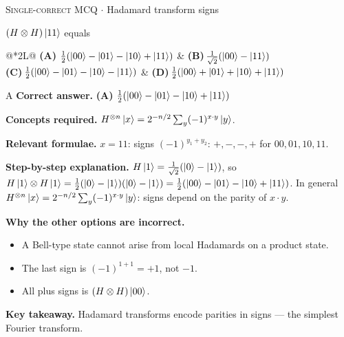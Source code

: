 \documentclass[11pt,a4paper]{article}
\newcommand{\optlabel}[1]{\textbf{(#1)}}
\newcommand{\correctlabel}[1]{\textcolor{okgreen}{\textbf{(#1)}\,\ding{51}}}
\newenvironment{qitem}[1]{\begin{list}{}{\setlength{\leftmargin}{3.3em}\setlength{\labelwidth}{3.1em}%
  \setlength{\labelsep}{0.2em}\setlength{\topsep}{3pt}\setlength{\parsep}{3pt}}\item[\textbf{Q.#1}\hfill]}{\end{list}}
\newcommand{\qsep}{\par\vspace{2pt}{\color{black!15}\hrule}\vspace{4pt}}
\newcommand{\qmeta}[2]{{\footnotesize\color{black!60}\textsc{#1} \;$\cdot$\; #2}\par}
\begin{document}
\begin{qitem}{28}
\qmeta{Single-correct MCQ}{Hadamard transform signs}
$(H\otimes H)\ket{11}$ equals
\par\smallskip\noindent\begin{tabularx}{\linewidth}{@{}*{2}{L}@{}}
\correctlabel{A}\,$\frac12(\ket{00} - \ket{01} - \ket{10} + \ket{11})$ & \optlabel{B}\,$\frac{1}{\sqrt2}(\ket{00} - \ket{11})$ \\[3pt]
\optlabel{C}\,$\frac12(\ket{00} - \ket{01} - \ket{10} - \ket{11})$ & \optlabel{D}\,$\frac12(\ket{00} + \ket{01} + \ket{10} + \ket{11})$
\end{tabularx}
\end{qitem}
\begin{solbox}{A}
\textbf{\color{brand}Correct answer.} \textcolor{okgreen}{\textbf{(A)}} $\frac12(\ket{00} - \ket{01} - \ket{10} + \ket{11})$

\textbf{\color{brand}Concepts required.} $H^{\otimes n}\ket x = 2^{-n/2}\sum_y(-1)^{x\cdot y}\ket y$.

\textbf{\color{brand}Relevant formulae.} $x = 11$: signs $(-1)^{y_1 + y_2}$: $+, -, -, +$ for $00, 01, 10, 11$.

\textbf{\color{brand}Step-by-step explanation.} $H\ket1 = \frac{1}{\sqrt2}(\ket0 - \ket1)$, so $H\ket1\otimes H\ket1 = \frac12(\ket0 - \ket1)(\ket0 - \ket1) = \frac12(\ket{00} - \ket{01} - \ket{10} + \ket{11})$.
In general $H^{\otimes n}\ket x = 2^{-n/2}\sum_y(-1)^{x\cdot y}\ket y$: signs depend on the parity of $x\cdot y$.

\textbf{\color{brand}Why the other options are incorrect.}
\begin{itemize}[leftmargin=2.4em, itemsep=1pt, topsep=2pt]
\item[\textbf{(B)}] A Bell-type state cannot arise from local Hadamards on a product state.
\item[\textbf{(C)}] The last sign is $(-1)^{1 + 1} = +1$, not $-1$.
\item[\textbf{(D)}] All plus signs is $(H\otimes H)\ket{00}$.
\end{itemize}
\textbf{\color{brand}Key takeaway.} Hadamard transforms encode parities in signs --- the simplest Fourier transform.
\end{solbox}
\qsep
\end{document}
